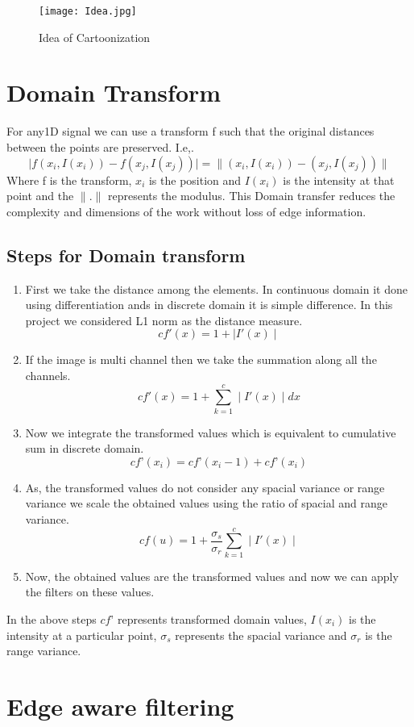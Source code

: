 \documentclass[conference]{IEEEtran}
\begin{document}
\begin{figure}
 	\texttt{[image: Idea.jpg]}
 	\caption{Idea of Cartoonization}
 	\label{fig:Idea}
 \end{figure}
 
 \section{Domain Transform}
For any1D signal we can use a transform f such that the original distances between the points are preserved. I.e,.
$$\mid f(x_i,I(x_i))-f(x_j,I(x_j)) \mid = \parallel (x_i,I(x_i))- (x_j,I(x_j)) \parallel $$
Where f is the transform, $x_i$ is the position and $I(x_i)$ is the intensity at that point and the $\parallel . \parallel$ represents the modulus. This Domain transfer reduces the complexity and dimensions of the work without loss of edge information.
	\subsection{Steps for Domain transform}
	\begin{enumerate}
		\item First we take the distance among the elements. In continuous domain it done using differentiation ands in discrete 				domain it is simple difference. In this project we considered L1 norm as the distance measure.
		$$ cf'(x) = 1 + \mid I'(x) \mid $$
		\item If the image is multi channel then we take the summation along all the channels.
		$$ cf'(x) = 1 + \sum_{k=1}^{c} \mid I'(x) \mid dx $$
		\item Now we integrate the transformed values which is equivalent to cumulative sum in discrete domain.
		$$ cf’(x_i) = cf’(x_i-1) + cf’(x_i) $$
		\item As, the transformed values do not consider any spacial variance or range variance we scale the obtained values 				using the ratio of spacial and range variance.
		$$ cf(u) = 1 + \frac{ {\sigma }_s}{\sigma_r} \sum_{k=1}^{c} \mid I'(x) \mid $$
		\item Now, the obtained values are the transformed values and now we can apply the filters on these values.
	\end{enumerate}
In the above steps $cf’$ represents transformed domain values, $I(x_i)$ is the intensity at a particular point, ${\sigma}_s$ represents the spacial variance and $\sigma_r$ is the range variance.
 
 \section{Edge aware filtering}
\end{document}
